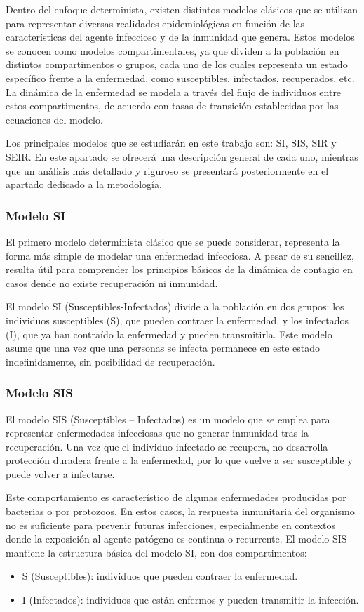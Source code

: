Dentro del enfoque determinista, existen distintos modelos clásicos que se utilizan para representar diversas realidades epidemiológicas en función de las características del agente infeccioso y de la inmunidad que genera. Estos modelos se conocen como modelos compartimentales, ya que dividen a la población en distintos compartimentos o grupos, cada uno de los cuales representa un estado específico frente a la enfermedad, como susceptibles, infectados, recuperados, etc. La dinámica de la enfermedad se modela a través del flujo de individuos entre estos compartimentos, de acuerdo con tasas de transición establecidas por las ecuaciones del modelo.

Los principales modelos que se estudiarán en este trabajo son: SI, SIS, SIR y SEIR. En este apartado se ofrecerá una descripción general de cada uno, mientras que un análisis más detallado y riguroso se presentará posteriormente en el apartado dedicado a la metodología.

\subsubsection*{Modelo SI}
El primero modelo determinista clásico que se puede considerar, representa la forma más simple de modelar una enfermedad infecciosa. A pesar de su sencillez, resulta útil para comprender los principios básicos de la dinámica de contagio en casos dende no existe recuperación ni inmunidad.

El modelo SI (Susceptibles-Infectados) divide a la población en dos grupos: los individuos susceptibles (S), que pueden contraer la enfermedad, y los infectados (I), que ya han contraído la enfermedad y pueden transmitirla. Este modelo asume que una vez que una personas se infecta permanece en este estado indefinidamente, sin posibilidad de recuperación.


\subsubsection*{Modelo SIS}
El modelo SIS (Susceptibles – Infectados) es un modelo que se emplea para representar enfermedades infecciosas que no generar inmunidad tras la recuperación. Una vez que el individuo infectado se recupera, no desarrolla protección duradera frente a la enfermedad, por lo que vuelve a ser susceptible y puede volver a infectarse.

Este comportamiento es característico de algunas enfermedades producidas por bacterias o por protozoos. En estos casos, la respuesta inmunitaria del organismo no es suficiente para prevenir futuras infecciones, especialmente en contextos donde la exposición al agente patógeno es continua o recurrente.
El modelo SIS mantiene la estructura básica del modelo SI, con dos compartimentos:
\begin{itemize}
    \item S (Susceptibles): individuos que pueden contraer la enfermedad.
    \item I (Infectados): individuos que están enfermos y pueden transmitir la infección.
\end{itemize}

